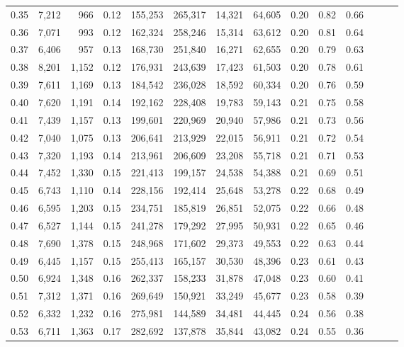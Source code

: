 \begin{tabular}{rrrrrrrrrrrrrr}
0.35 &  7,212 &    966 &  0.12 &  155,253 &  265,317 &  14,321 &  64,605 &  0.20 &  0.82 &      0.66 \\
0.36 &  7,071 &    993 &  0.12 &  162,324 &  258,246 &  15,314 &  63,612 &  0.20 &  0.81 &      0.64 \\
0.37 &  6,406 &    957 &  0.13 &  168,730 &  251,840 &  16,271 &  62,655 &  0.20 &  0.79 &      0.63 \\
0.38 &  8,201 &  1,152 &  0.12 &  176,931 &  243,639 &  17,423 &  61,503 &  0.20 &  0.78 &      0.61 \\
0.39 &  7,611 &  1,169 &  0.13 &  184,542 &  236,028 &  18,592 &  60,334 &  0.20 &  0.76 &      0.59 \\
0.40 &  7,620 &  1,191 &  0.14 &  192,162 &  228,408 &  19,783 &  59,143 &  0.21 &  0.75 &      0.58 \\
0.41 &  7,439 &  1,157 &  0.13 &  199,601 &  220,969 &  20,940 &  57,986 &  0.21 &  0.73 &      0.56 \\
0.42 &  7,040 &  1,075 &  0.13 &  206,641 &  213,929 &  22,015 &  56,911 &  0.21 &  0.72 &      0.54 \\
0.43 &  7,320 &  1,193 &  0.14 &  213,961 &  206,609 &  23,208 &  55,718 &  0.21 &  0.71 &      0.53 \\
0.44 &  7,452 &  1,330 &  0.15 &  221,413 &  199,157 &  24,538 &  54,388 &  0.21 &  0.69 &      0.51 \\
0.45 &  6,743 &  1,110 &  0.14 &  228,156 &  192,414 &  25,648 &  53,278 &  0.22 &  0.68 &      0.49 \\
0.46 &  6,595 &  1,203 &  0.15 &  234,751 &  185,819 &  26,851 &  52,075 &  0.22 &  0.66 &      0.48 \\
0.47 &  6,527 &  1,144 &  0.15 &  241,278 &  179,292 &  27,995 &  50,931 &  0.22 &  0.65 &      0.46 \\
0.48 &  7,690 &  1,378 &  0.15 &  248,968 &  171,602 &  29,373 &  49,553 &  0.22 &  0.63 &      0.44 \\
0.49 &  6,445 &  1,157 &  0.15 &  255,413 &  165,157 &  30,530 &  48,396 &  0.23 &  0.61 &      0.43 \\
0.50 &  6,924 &  1,348 &  0.16 &  262,337 &  158,233 &  31,878 &  47,048 &  0.23 &  0.60 &      0.41 \\
0.51 &  7,312 &  1,371 &  0.16 &  269,649 &  150,921 &  33,249 &  45,677 &  0.23 &  0.58 &      0.39 \\
0.52 &  6,332 &  1,232 &  0.16 &  275,981 &  144,589 &  34,481 &  44,445 &  0.24 &  0.56 &      0.38 \\
0.53 &  6,711 &  1,363 &  0.17 &  282,692 &  137,878 &  35,844 &  43,082 &  0.24 &  0.55 &      0.36 \\

\end{tabular}
